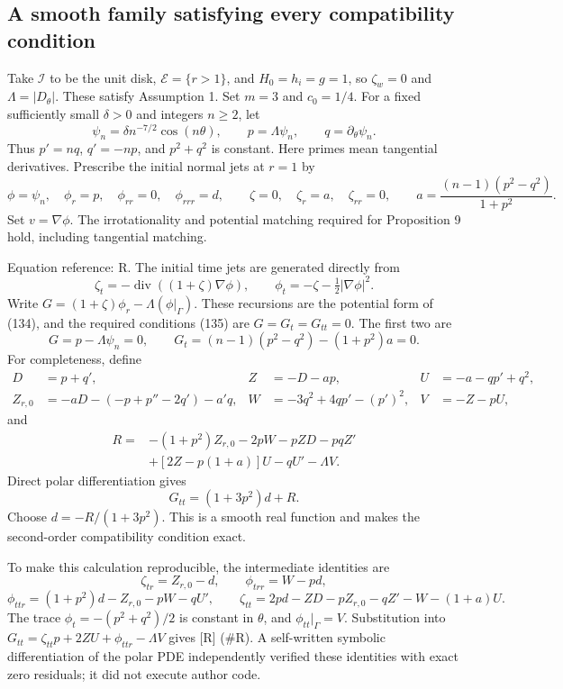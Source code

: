 \documentclass[10pt]{article}
\begin{document}
\subsection*{A smooth family satisfying every compatibility condition}
Take \(\mathcal I\) to be the unit disk, \(\mathcal E=\{r>1\}\), and \(H_0=h_i=g=1\), so \(\zeta_w=0\) and \(\Lambda=|D_\theta|\). These satisfy Assumption 1. Set \(m=3\) and \(c_0=1/4\). For a fixed sufficiently small \(\delta>0\) and integers \(n\ge2\), let \[\psi_n=\delta n^{-7/2}\cos(n\theta),\qquad
 p=\Lambda\psi_n,\qquad q=\partial_\theta\psi_n.\] Thus \(p'=nq\), \(q'=-np\), and \(p^2+q^2\) is constant. Here primes mean tangential derivatives. Prescribe the initial normal jets at \(r=1\) by \[\phi=\psi_n,\quad \phi_r=p,\quad \phi_{rr}=0,\quad \phi_{rrr}=d,
 \qquad \zeta=0,\quad \zeta_r=a,\quad \zeta_{rr}=0,
 \qquad a=\frac{(n-1)(p^2-q^2)}{1+p^2}.\] Set \(v=\nabla\phi\). The irrotationality and potential matching required for Proposition 9 hold, including tangential matching.\par
Equation reference: R. The initial time jets are generated directly from \[\zeta_t=-\mathop{\mathrm{div}}((1+\zeta)\nabla\phi),\qquad
 \phi_t=-\zeta-\tfrac12|\nabla\phi|^2.\] Write \(G=(1+\zeta)\phi_r-\Lambda(\phi|_\Gamma)\). These recursions are the potential form of (134), and the required conditions (135) are \(G=G_t=G_{tt}=0\). The first two are \[G=p-\Lambda\psi_n=0,\qquad
 G_t=(n-1)(p^2-q^2)-(1+p^2)a=0.\] For completeness, define \[\begin{aligned}
 D&=p+q',& Z&=-D-ap,& U&=-a-qp'+q^2,\\
 Z_{r,0}&=-aD-(-p+p''-2q')-a'q,&
 W&=-3q^2+4qp'-(p')^2,& V&=-Z-pU,\end{aligned}\] and \[
\begin{split}
 R={}&-(1+p^2)Z_{r,0}-2pW-pZD-pqZ'\\
    &+[2Z-p(1+a)]U-qU'-\Lambda V.
\end{split}\] Direct polar differentiation gives \[G_{tt}=(1+3p^2)d+R.\] Choose \(d=-R/(1+3p^2)\). This is a smooth real function and makes the second-order compatibility condition exact.\par
To make this calculation reproducible, the intermediate identities are \[\zeta_{tr}=Z_{r,0}-d,\qquad \phi_{trr}=W-pd,\] \[\phi_{ttr}=(1+p^2)d-Z_{r,0}-pW-qU',\qquad
 \zeta_{tt}=2pd-ZD-pZ_{r,0}-qZ'-W-(1+a)U.\] The trace \(\phi_t=-(p^2+q^2)/2\) is constant in \(\theta\), and \(\phi_{tt}|_\Gamma=V\). Substitution into \(G_{tt}=\zeta_{tt}p+2ZU+\phi_{ttr}-\Lambda V\) gives [R] (\#R). A self-written symbolic differentiation of the polar PDE independently verified these identities with exact zero residuals; it did not execute author code.\par
\end{document}
